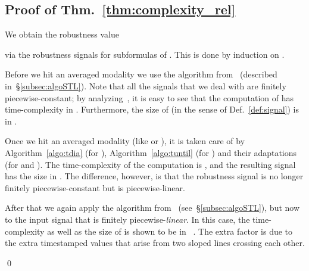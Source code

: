 \documentclass[envcountsect,orivec]{llncs} \usepackage{etex} \usepackage[]{graphicx}
\newif\ifignore \ignorefalse
\newcommand{\auxproof}[1]{
  \ifignore\mbox{}\newline
  \textbf{BEGIN: AUX-PROOF} \dotfill\newline
  {#1}\mbox{}\newline
  \textbf{END: AUX-PROOF}\dotfill\newline
  \fi}
\def\myqed{\qed}
\begin{document}
\subsection{Proof of Thm.~\ref{thm:complexity_rel}}
\begin{myproof} 
 We obtain the robustness value
 
 via the robustness signals  for subformulas 
 of . This is done by induction on .
 
 Before we hit an averaged modality we use the algorithm from~\cite{DBLP:conf/cav/DonzeFM13} (described
 in~\S{}\ref{subsec:algoSTL}).
 Note that all the signals that we deal with are
 finitely piecewise-constant; by
 analyzing~\cite[Thm.~3]{DBLP:conf/cav/DonzeFM13},
 it is easy to see that the computation of
 has time-complexity in
 . Furthermore, the size of 
  (in the sense of Def.~\ref{def:signal}) is 
 in .


 Once we hit an averaged modality (like  or ),
 it is
 taken care of by  Algorithm~\ref{algo:tdia} (for ), 
 Algorithm~\ref{algo:tuntil} (for ) and their adaptations
 (for  and ). The time-complexity of the computation is
  , and the resulting 
 signal  has the size 
 in .
The difference, however, is that the robustness signal
  is no longer finitely piecewise-constant but is
 piecewise-linear.

 After that we again apply the algorithm from~\cite{DBLP:conf/cav/DonzeFM13} (see~\S{}\ref{subsec:algoSTL}),
 but now to the input signal that is finitely
 piecewise-\emph{linear}. In this case, the
 time-complexity as well as the size of   is shown to be
 in ~\cite[Thm.~3]{DBLP:conf/cav/DonzeFM13}. The extra factor
 is due to the extra timestamped values that arise from 
  two sloped lines crossing each other.
\auxproof{
  First, in the case of  is averaging-free,
  then the statement is obviously true from Thm.~\ref{thm:complexity}.
  Then, let us consider 
  the case of  
  where  is averaging-free.
  Because  is averaging-free,
  we can calculate  
  with time-complexity in 
  
  from Thm.~\ref{thm:complexity}.
  Moreover,
  the number of the timestamps of 
  is bounded above by .
  See Theorem~3 in \cite{DBLP:conf/cav/DonzeFM13}.
  Hence the function
  
  is computed in time 
  from Prop.~\ref{prop:complexity_tdia}.
  By the construction,
  the number of the timestamps of 
  is bounded above by .
  Now we apply Thm.~\ref{thm:complexity},
  and obtain the function .
  The time-complexity of this step is
  
  Hence the total time-complexity is 
  
  Finally, about the case of ,
  we can proof in the same manner.
}  \myqed
\end{myproof}
\end{document}
